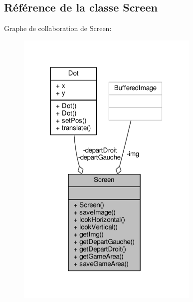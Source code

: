 \hypertarget{classScreen}{}\subsection{Référence de la classe Screen}
\label{classScreen}


Graphe de collaboration de Screen\+:\nopagebreak
\begin{figure}[H]
\begin{center}
\leavevmode
\includegraphics[width=248pt]{classScreen__coll__graph}
\end{center}
\end{figure}
